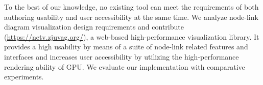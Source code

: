 
To the best of our knowledge, no existing tool can meet the requirements of both authoring usability and user accessibility at the same time. We analyze node-link diagram visualization design requirements and contribute \name (\url{https://netv.zjuvag.org/}), a web-based high-performance visualization library. It provides a high usability by means of a suite of node-link related features and interfaces and increases user accessibility by utilizing the high-performance rendering ability of GPU.
We evaluate our implementation with comparative experiments.

